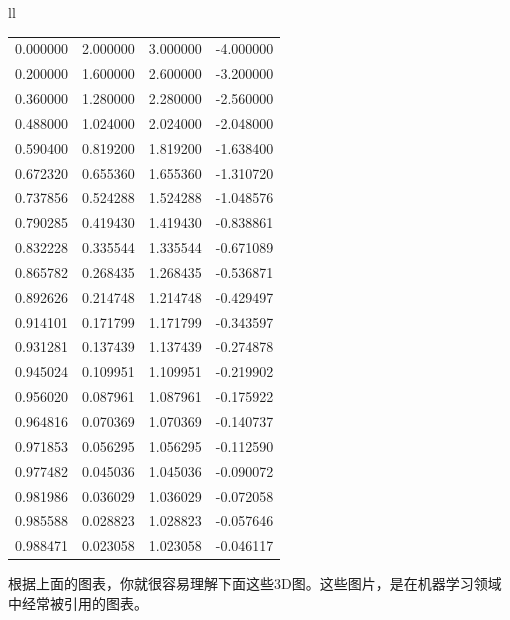 \documentclass[12pt]{article}
\numberwithin{figure}{section}
\newenvironment{fullmodel}{
			\smallskip\noindent
			\begin{minipage}{\textwidth+\marginparwidth+\marginparsep}\smallskip\smallskip}
			{\smallskip\smallskip\end{minipage}\vspace{.1in}
			}
\numberwithin{equation}{section}
\begin{document}
\begin{fullmodel}
\begin{table}[H]
\begin{tabular}{ll}
\begin{tabular}{rrrr}
\midrule
 0.000000 &     2.000000 &  3.000000 &     -4.000000 \\
 0.200000 &     1.600000 &  2.600000 &     -3.200000 \\
 0.360000 &     1.280000 &  2.280000 &     -2.560000 \\
 0.488000 &     1.024000 &  2.024000 &     -2.048000 \\
 0.590400 &     0.819200 &  1.819200 &     -1.638400 \\
 0.672320 &     0.655360 &  1.655360 &     -1.310720 \\
 0.737856 &     0.524288 &  1.524288 &     -1.048576 \\
 0.790285 &     0.419430 &  1.419430 &     -0.838861 \\
 0.832228 &     0.335544 &  1.335544 &     -0.671089 \\
 0.865782 &     0.268435 &  1.268435 &     -0.536871 \\
 0.892626 &     0.214748 &  1.214748 &     -0.429497 \\
 0.914101 &     0.171799 &  1.171799 &     -0.343597 \\
 0.931281 &     0.137439 &  1.137439 &     -0.274878 \\
 0.945024 &     0.109951 &  1.109951 &     -0.219902 \\
 0.956020 &     0.087961 &  1.087961 &     -0.175922 \\
 0.964816 &     0.070369 &  1.070369 &     -0.140737 \\
 0.971853 &     0.056295 &  1.056295 &     -0.112590 \\
 0.977482 &     0.045036 &  1.045036 &     -0.090072 \\
 0.981986 &     0.036029 &  1.036029 &     -0.072058 \\
 0.985588 &     0.028823 &  1.028823 &     -0.057646 \\
 0.988471 &     0.023058 &  1.023058 &     -0.046117 \\
\bottomrule
\end{tabular}
		\end{tabular}
	\end{table}
根据上面的图表，你就很容易理解下面这些3D图。这些图片，是在机器学习领域中经常被引用的图表。
\begin{figure}[H]
	\centering
	\begin{subfigure}[b]{0.4\textwidth}
	\centering

\end{subfigure}
\end{figure}
\end{fullmodel}
\end{document}
